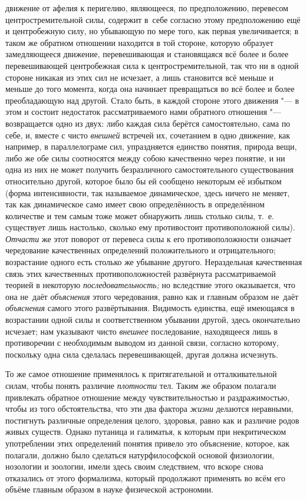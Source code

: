 движение от афелия к перигелию, являющееся, по предположению, перевесом
центростремительной силы, содержит в~себе согласно этому предположению ещё и
центробежную силу, но убывающую по мере того, как первая увеличивается; в таком
же обратном отношении находится в той стороне, которую образует замедляющееся
движение, перевешивающая и становящаяся всё более и более перевешивающей
центробежная сила к центростремительной, так что ни в одной стороне никакая из
этих сил не исчезает, а лишь становится всё меньше и меньше до того момента,
когда она начинает превращаться во всё более и более преобладающую над другой.
Стало быть, в каждой стороне этого движения "--- в этом и состоит недостаток
рассматриваемого нами обратного отношения "--- возвращается одно из двух: либо
каждая сила берётся самостоятельно, сама по себе, и, вместе с чисто
{\em внешней} встречей их, сочетанием в одно движение, как например, в
параллелограме сил, упраздняется единство понятия, природа вещи, либо же обе
силы соотносятся между собою качественно через понятие, и ни одна из них не
может получить безразличного самостоятельного существования относительно
другой, которое было бы ей сообщено некоторым её избытком (форма интенсивности,
так называемое динамическое, здесь ничего не меняет, так как динамическое само
имеет свою определённость в определённом количестве и тем самым тоже может
обнаружить лишь столько силы, т.~е. существует лишь настолько, сколько ему
противостоит противоположной силы). {\em Отчасти} же этот поворот от перевеса
силы к его противоположности означает чередование качественных определений
положительного и отрицательного; возрастание одного есть столько же убывание
другого. Нераздельная качественная связь этих качественных противоположностей
развёрнута рассматриваемой теорией в некоторую {\em последовательность;} но
вследствие этого оказывается, что она не~даёт {\em объяснения} этого
чередования, равно как и главным образом не~даёт {\em объяснения} самого этого
развёртывания. Видимость единства, ещё имеющаяся в возрастании одной силы и
соответственном убывании другой, здесь окончательно исчезает; нам указывают
чисто {\em внешнее} последование, находящееся лишь в противоречии с необходимым
выводом из данной связи, согласно которому, поскольку одна сила сделалась
перевешивающей, другая должна исчезнуть.

То же самое отношение применялось к притягательной и отталкивательной силам,
чтобы понять различие {\em плотности} тел. Таким же образом полагали привлекать
обратное отношение между чувствительностью и раздражимостью, чтобы из того
обстоятельства, что эти два фактора {\em жизни} делаются неравными, постигнуть
различные определения целого, здоровья, равно как и различие родов живых
существ. Однако путаница и галиматья, к которым при некритическом употреблении
этих определений понятия привело это объяснение, которое, как полагали, должно
было сделаться натурфилософской основой физиологии, нозологии и зоологии, имели
здесь своим следствием, что вскоре снова отказались от этого формализма,
который продолжают применять во всём его объёме главным образом в науке
физической астрономии.

